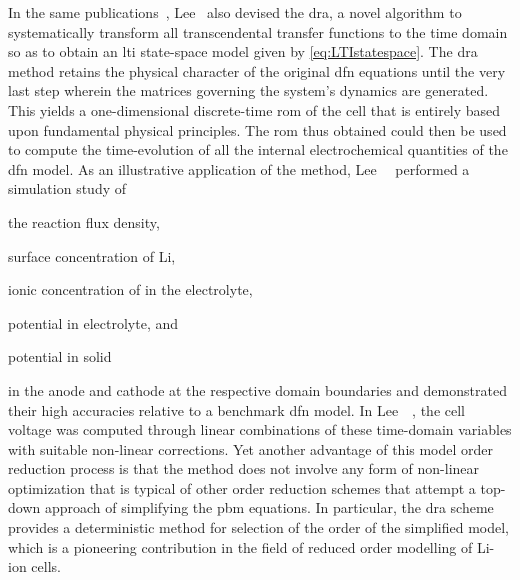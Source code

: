 In the  same publications~\cite{Lee2012a,Lee2012}, Lee~\etal{} also  devised the
\gls{dra},  a novel  algorithm  to systematically  transform all  transcendental
transfer functions to  the time domain so as to  obtain an \gls{lti} state-space
model  given  by \cref{eq:LTIstatespace}.  The   \gls{dra}  method  retains  the
physical character of the original \gls{dfn}  equations until the very last step
wherein the matrices governing the  system's dynamics are generated. This yields
a one-dimensional  discrete-time \gls{rom}  of the cell  that is  entirely based
upon fundamental  physical principles.  The \gls{rom}  thus obtained  could then
be  used to  compute  the  time-evolution of  all  the internal  electrochemical
quantities of the \gls{dfn} model. As an illustrative application of the method,
Lee~\etal~\cite{Lee2012a} performed a simulation study of
\begin{enumerate*}[label=\itshape\alph*\upshape)]
    \item the reaction flux density,
    \item surface concentration of Li,
    \item ionic concentration of  in the electrolyte,
    \item potential in electrolyte, and
    \item potential in solid
\end{enumerate*}
in   the  anode   and  cathode   at   the  respective   domain  boundaries   and
demonstrated  their high  accuracies relative  to a  benchmark \gls{dfn}  model.
In  Lee~\etal~\cite{Lee2012,Lee2012a}, the  cell  voltage  was computed  through
linear  combinations of  these  time-domain variables  with suitable  non-linear
corrections. Yet another advantage of this model order reduction process is that
the method does not involve any  form of non-linear optimization that is typical
of other order reduction schemes that attempt a top-down approach of simplifying
the \gls{pbm} equations. In  particular, the \gls{dra} scheme provides
a deterministic method for selection of the order of the simplified model, which
is a pioneering  contribution in the field of reduced  order modelling of Li-ion
cells.


